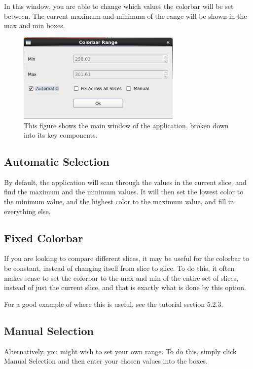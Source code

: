 \documentclass[a4paper,12pt]{article}
\begin{document}
In this window, you are able to change which values the colorbar will be set
between.  The current maximum and minimum of the range will be shown in the
max and min boxes.

\begin{figure}[h]
\centering
\includegraphics[width=80mm]{resources/colorbarRangeDiagram.png}
\caption{This figure shows the main window of the application, broken down into
its key components.}
\label{overflow}
\end{figure}

\subsection{Automatic Selection}

By default, the application will scan through the values in the current slice,
and find the maximum and the minimum values. It will then set the lowest color
to the minimum value, and the highest color to the maximum value, and fill
in everything else.

\subsection{Fixed Colorbar}

If you are looking to compare different slices, it may be useful for the
colorbar to be constant, instead of changing itself from slice to slice. To
do this, it often makes sense to set the colorbar to the max and min of the
entire set of slices, instead of just the current slice, and that is exactly
what is done by this option.

For a good example of where this is useful, see the tutorial section 5.2.3.

\subsection{Manual Selection}

Alternatively, you might wish to set your own range. To do this, simply click
Manual Selection and then enter your chosen values into the boxes.
\end{document}
